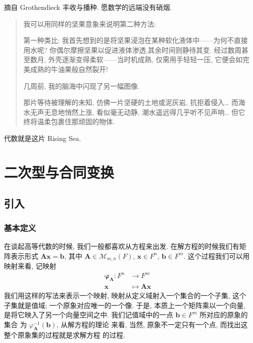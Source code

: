 \documentclass[UTF8]{book}
\begin{document}
\vspace*{5em}

摘自 Grothendieck 丰收与播种. 愿数学的远端没有硝烟. 

\begin{quotation}
    
    \kaishu   
    我可以用同样的坚果意象来说明第二种方法: 
    
    第一种类比: 
    我首先想到的是将坚果浸泡在某种软化液体中——为何不直接用水呢? 
    你偶尔摩擦坚果以促进液体渗透,其余时间则静待其变. 
    经过数周甚至数月, 外壳逐渐变得柔软——当时机成熟, 仅需用手轻轻一压, 
    它便会如完美成熟的牛油果般自然裂开! 

    几周前, 我的脑海中闪现了另一幅图像. 
      
    那片等待被理解的未知, 仿佛一片坚硬的土地或泥灰岩, 抗拒着侵入\dots
    而海水无声无息地悄然上涨, 看似毫无动静, 潮水遥远得几乎听不见声响\dots 
    但它终将温柔包裹住那顽固的物体. 
    
\end{quotation}

代数就是这片 Rising Sea. 

\setcounter{chapter}{2}
\chapter{二次型与合同变换}

\section{引入} 

\subsection{基本定义}

在谈起高等代数的时候, 我们一般都喜欢从方程来出发. 
在解方程的时候我们有矩阵表示形式 $ \boldsymbol{A}\boldsymbol{x}
=\boldsymbol{b} $, 其中 $ \boldsymbol{A} \in \mathcal{M}_{m,n}(F)$, 
$ \boldsymbol{x} \in F^n $, 
$ \boldsymbol{b} \in F^m $. 
这个过程我们可以用映射来看, 记映射 
\begin{equation} \label{linear map A}
    \begin{aligned}
        \boldsymbol{\varphi_{\boldsymbol{A}}} : 
        F^n &\to F^m \\
        \boldsymbol{x} &\mapsto \boldsymbol{A}\boldsymbol{x}
    \end{aligned}
\end{equation}
我们用这样的写法来表示一个映射, 映射从定义域射入一个集合的一个子集, 
这个子集就是值域; 一个原象对应唯一的一个像. 
于是, 本质上一个矩阵乘以一个向量, 是将它映入了另一个向量空间之中. 
我们记值域中的一点 $ \boldsymbol{b} \in F^m $ 所对应的原象的集合
为 $\varphi_{\boldsymbol{A}}^{-1}(\boldsymbol{b})$, 从解方程的理论
来看, 当然, 原象不一定只有一个点, 而找出这整个原象集的过程就是求解方程
的过程. 
\end{document}
